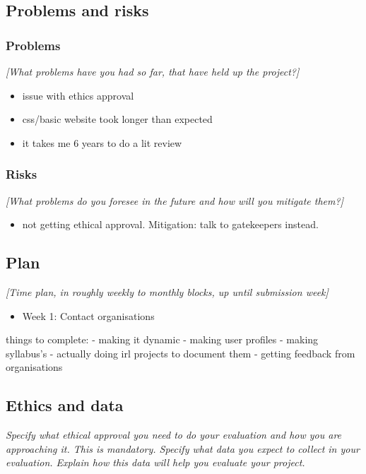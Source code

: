 \documentclass[11pt]{article}
\begin{document}
\subsection{Problems and risks}\label{problems-and-risks}

\subsubsection{Problems}\label{problems}

\emph{{[}What problems have you had so far, that have held up the
project?{]}} 
\begin{itemize}
    \item issue with ethics approval 
    \item css/basic website took longer than expected
    \item it takes me 6 years to do a lit review
\end{itemize}

\subsubsection{Risks}\label{risks}

\emph{{[}What problems do you foresee in the future and how will you
mitigate them?{]}}

\begin{itemize}
    \item not getting ethical approval. Mitigation: talk to gatekeepers instead.
    
\end{itemize}

\subsection{Plan}\label{plan}

\emph{{[}Time plan, in roughly weekly to monthly blocks, up until
submission week{]}}
\begin{itemize}
    \item Week 1: Contact organisations 
\end{itemize}
things to complete: 
- making it dynamic
- making user profiles 
- making syllabus's
- actually doing irl projects to document them 
- getting feedback from organisations 
    
\subsection{Ethics and data}\label{ethics}
\emph{Specify what ethical approval you need to do your evaluation and how you are approaching it. This is mandatory. 
Specify what data you expect to collect in your evaluation. Explain how this data will help you evaluate your project.
}
\end{document}
